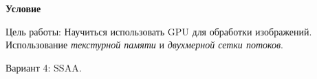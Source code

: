 \textbf{\large Условие}

Цель работы: Научиться использовать GPU для обработки изображений. Использование \textit{текстурной памяти} и \textit{двухмерной сетки потоков}.

Вариант 4: SSAA.

